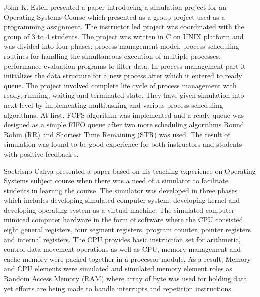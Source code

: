 \begin{onehalfspacing}
\par John K. Estell \cite{John} presented a paper introducing a simulation project for an Operating Systems Course which presented as a group project used as a programming assignment. The instructor led project was coordinated with the group of 3 to 4 students. The project was written in C on UNIX platform and was divided into four phases: process management model, process scheduling routines for handling the simultaneous execution of multiple processes, performance evaluation programs to filter data. In process management part it initializes the data structure for a new process after which it entered to ready queue. The project involved complete life cycle of process management with ready, running, waiting and terminated state. They have given simulation into next level by implementing multitasking and various process scheduling algorithms. At first, FCFS algorithm was implemented and a ready queue was designed as a simple FIFO queue after two more scheduling algorithms Round Robin (RR) and Shortest Time Remaining (STR) was used. The result of simulation was found to be good experience for both instructors and students with positive feedback's. \newline

\par Soetrisno Cahya \cite{Cahya} presented a paper based on his teaching experience on Operating Systems subject course when there was a need of a simulator to facilitate students in learnng the course. The simulator was developed in three phases which includes developing simulated computer system, developing kernel and developing operating system as a virtual machine. The simulated computer mimiced computer hardware in the form of software where the CPU consisted eight general registers, four segment registers, program counter, pointer registers and internal registers. The CPU provides basic instruction set for arithmetic, control data movement operations as well as CPU, memory management and cache memory were packed together in a processor module. As a result, Memory and CPU elements were simulated and simulated memory element roles as Random Access Memory (RAM) where array of byte was used for holding data yet efforts are being made to handle interrupts and repetition instructions.\newline\newline


\end{onehalfspacing}
